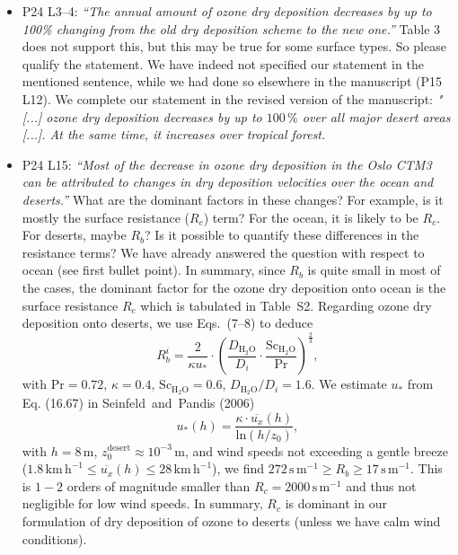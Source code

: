 \begin{itemize}
\item {\color{blue}  P24 L3--4: \emph{“The annual amount of ozone dry deposition decreases by up
to 100\% changing from the old dry deposition scheme to the new one.”} Table 3 does
not support this, but this may be true for some surface types. So please qualify the
statement.}
  We have indeed not specified our statement in the mentioned sentence, while we had done so elsewhere in the manuscript (P15 L12). We complete our statement in the revised version of the manuscript:
  \emph{"[...] ozone dry deposition decreases by up to $100\,\%$ over all major desert areas [...]. At the same time, it increases over tropical forest.}
  
\item {\color{blue}  P24 L15: \emph{“Most of the decrease in ozone dry deposition in the Oslo CTM3
can be attributed to changes in dry deposition velocities over the ocean and deserts.”}
What are the dominant factors in these changes? For example, is it mostly the surface
resistance ($R_c$) term? For the ocean, it is likely to be $R_c$. For deserts, maybe $R_b$? Is it
possible to quantify these differences in the resistance terms?}
  We have already answered the question with respect to ocean (see first bullet point). In summary, since $R_b$ is quite small in most of the cases, the dominant factor for the ozone dry deposition onto ocean is the surface resistance $R_c$ which is tabulated in Table~S2. Regarding ozone dry deposition onto deserts, we use Eqs.~(7--8) to deduce
  \begin{equation}
    R_b^i = \frac{2}{\kappa u_*} \cdot \left(\frac{D_\mathrm{H_2O}}{D_i} \cdot \frac{\mathrm{Sc}_\mathrm{H_2O}}{\mathrm{Pr}}\right)^{\frac{2}{3}},
  \end{equation}
  with $\mathrm{Pr}=0.72$, $\kappa=0.4$, $\mathrm{Sc}_\mathrm{H_2O} = 0.6$, $D_\mathrm{H_2O}/D_i = 1.6$.
  We estimate $u_*$ from Eq. (16.67) in Seinfeld~and~Pandis (2006)
  \begin{equation}
    u_*(h) = \frac{\kappa\cdot \overline{u_x}(h)}{\mathrm{ln}(h/z_0)},
  \end{equation}
  with $h = 8\,\mathrm{m}$, $z_0^\mathrm{desert}\approx 10^{-3}\,\mathrm{m}$, and wind speeds not exceeding a gentle breeze ($1.8\,\mathrm{km\,h^{-1}} \leq \overline{u_x}(h) \leq 28\,\mathrm{km\,h^{-1}}$), we find $272\,\mathrm{s\,m^{-1}} \geq R_b \geq 17\,\mathrm{s\,m^{-1}}$. This is $1-2$ orders of magnitude smaller than $R_c = 2000\,\mathrm{s\,m^{-1}}$ and thus not negligible for low wind speeds. In summary, $R_c$ is dominant in our formulation of dry deposition of ozone to deserts (unless we have calm wind conditions).
  \emph{}
  

\end{itemize}
